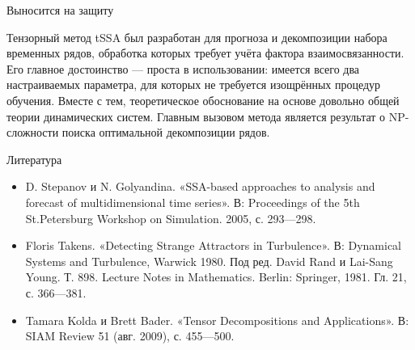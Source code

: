 	\begin{frame}{Выносится на защиту}
		
		Тензорный метод tSSA был разработан для прогноза и декомпозиции набора временных рядов, обработка которых требует учёта фактора взаимосвязанности. Его главное достоинство --- проста в использовании: имеется всего два настраиваемых параметра, для которых не требуется изощрённых процедур обучения. Вместе с тем, теоретическое обоснование на основе довольно общей теории динамических систем. Главным вызовом метода является результат о NP-сложности поиска оптимальной декомпозиции рядов.
		
	\end{frame}
	
	\begin{frame}{Литература}
		
		\begin{itemize}
			\item D. Stepanov и N. Golyandina. «SSA-based approaches to analysis and forecast of multidimensional
			time series». В: Proceedings of the 5th St.Petersburg Workshop on Simulation. 2005,	с. 293—298.
			\item Floris Takens. «Detecting Strange Attractors in Turbulence». В: Dynamical Systems and Turbulence, Warwick 1980. Под ред. David Rand и Lai-Sang Young. Т. 898. Lecture	Notes in Mathematics. Berlin: Springer, 1981. Гл. 21, с. 366—381.
			\item Tamara Kolda и Brett Bader. «Tensor Decompositions and Applications». В: SIAM Review 51 (авг. 2009), с. 455—500.
		\end{itemize}
			
	\end{frame}
	
	
